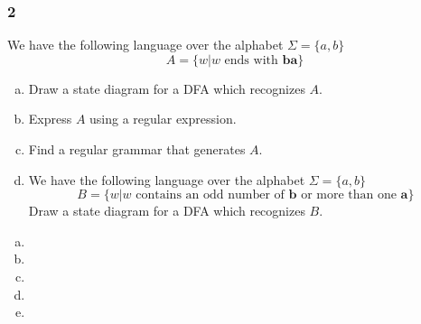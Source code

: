 \documentclass[../main.tex]{subfiles}
\begin{document}
\subsubsection*{2\hfill}
We have the following language over the alphabet $\Sigma = \{a, b\}$
\begin{equation*}
	A = \{w | w \text{ ends with } \mathbf{ba}\}
\end{equation*}
\begin{enumerate}[a)]
	\item Draw a state diagram for a DFA which recognizes $A$.
	\item Express $A$ using a regular expression.
	\item Find a regular grammar that generates $A$.
	\item We have the following language over the alphabet $\Sigma = \{a, b\}$
		\begin{equation*}
			B = \{w | w \text{ contains an odd number of } \mathbf{b} \text{ or more than one } \mathbf{a}\}
		\end{equation*}
		Draw a state diagram for a DFA which recognizes $B$.
\end{enumerate}

\solution
\begin{enumerate}[a)]
	\item 
	\item 
	\item 
	\item 
	\item 
\end{enumerate}
\end{document}
